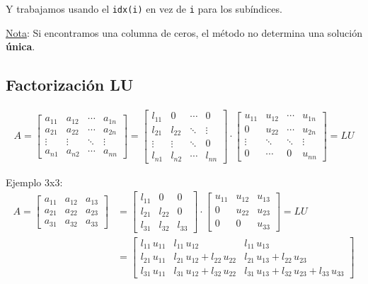\documentclass[10pt,a4paper]{article}
\begin{document}
Y trabajamos usando el \texttt{idx(i)} en vez de \texttt{i} para los subíndices.

\small{\underline{Nota}: Si encontramos una columna de ceros, el método no determina una solución \textbf{única}.}

\subsection{Factorización LU}

\begin{align*}
A = \begin{bmatrix}
a_{11} & a_{12} & \cdots & a_{1n} \\
a_{21} & a_{22} & \cdots & a_{2n} \\
\vdots & \vdots & \ddots & \vdots \\
a_{n1} & a_{n2} & \cdots & a_{nn} 
\end{bmatrix} =
\begin{bmatrix}
l_{11} & 0 & \cdots & 0 \\
l_{21} & l_{22} & \ddots & \vdots \\
\vdots & \vdots & \ddots & 0 \\
l_{n1} & l_{n2} & \cdots & l_{nn}
\end{bmatrix}
\cdot
\begin{bmatrix}
u_{11} & u_{12} & \cdots & u_{1n} \\
0 & u_{22} & \cdots & u_{2n} \\
\vdots & \ddots & \ddots & \vdots \\
0 & \cdots & 0 & u_{nn} 
\end{bmatrix} = LU
\end{align*}

Ejemplo 3x3:
\begin{align*}
A=\begin{bmatrix}
a_{11} & a_{12} & a_{13} \\
a_{21} & a_{22} & a_{23} \\
a_{31} & a_{32} & a_{33} 
\end{bmatrix} &=
\begin{bmatrix}
l_{11} & 0 & 0 \\
l_{21} & l_{22} & 0 \\
l_{31} & l_{32} & l_{33} 
\end{bmatrix}
\cdot
\begin{bmatrix}
u_{11} & u_{12} & u_{13} \\
0 & u_{22} & u_{23} \\
0 & 0 & u_{33} 
\end{bmatrix} =LU \\ &=
\begin{bmatrix}
l_{11} \, u_{11} & l_{11} \, u_{12} & l_{11} \, u_{13} \\
l_{21} \, u_{11} & l_{21} \, u_{12} + l_{22} \, u_{22} & l_{21} \, u_{13} + l_{22} \, u_{23}\\
l_{31} \, u_{11} 
& l_{31} \, u_{12} + l_{32} \, u_{22}
& l_{31} \, u_{13} + l_{32} \, u_{23} + l_{33} \, u_{33}
\end{bmatrix}
\end{align*}
\end{document}
